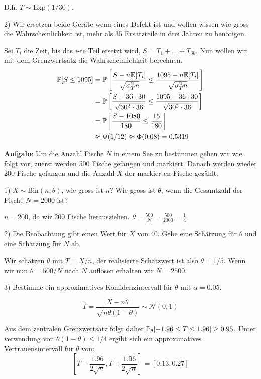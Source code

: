 D.h. $T \sim \text{Exp}(1/30)$.

\smallskip

2) Wir ersetzen beide Geräte wenn eines Defekt ist und wollen wissen wie gross die Wahrscheinlichkeit ist, mehr als 35 Ersatzteile in drei Jahren zu benötigen.

Sei $T_i$ die Zeit, bis das $i$-te Teil ersetzt wird, $S = T_1 + ... + T_{36}$. Nun wollen wir mit dem Grenzwertsatz die Wahrscheinlichkeit berechnen.
\begin{align*}
	\mathbb{P}[S \leq 1095] &= \mathbb{P} \left[ \frac{S - n \mathbb{E}[T_i]}{\sqrt{\sigma_T^2 n}} \leq \frac{1095 - n \mathbb{E}[T_i]}{\sqrt{\sigma_T^2 n}}\right] \\
	&= \mathbb{P} \left[ \frac{S - 36 \cdot 30}{\sqrt{30^2 \cdot 36}} \leq \frac{1095 - 36 \cdot 30}{\sqrt{30^2 \cdot 36}} \right] \\
	&= \mathbb{P} \left[ \frac{S - 1080}{180} \leq \frac{15}{180} \right] \\
	&\approx \Phi(1/12) \approx \Phi(0.08) = 0.5319
\end{align*}

\hrulefill

\textbf{Aufgabe}
Um die Anzahl Fische $N$ in einem See zu bestimmen gehen wir wie folgt vor, zuerst werden 500 Fische gefangen und markiert. Danach werden wieder 200 Fische gefangen und die Anzahl $X$ der markierten Fische gezählt. \smallskip

1) $X \sim \text{Bin}(n, \theta)$, wie gross ist $n$? Wie gross ist $\theta$, wenn die Gesamtzahl der Fische $N = 2000$ ist?

$n = 200$, da wir 200 Fische herausziehen. $\theta = \frac{500}{N} = \frac{500}{2000} = \frac{1}{4}$ \smallskip

2) Die Beobachtung gibt einen Wert für $X$ von 40. Gebe eine Schätzung für $\theta$ und eine Schätzung für $N$ ab.

Wir schätzen $\theta$ mit $T = X / n$, der realisierte Schätzwert ist also $\theta = 1/5$. Wenn wir nun $\theta = 500 / N$ nach $N$ auflösen erhalten wir $N = 2500$. \smallskip

3) Bestimme ein approximatives Konfidenzintervall für $\theta$ mit $\alpha = 0.05$.

$$T = \frac{X - n \theta}{\sqrt{n\theta(1-\theta)}} \sim \mathcal N (0,1)$$

Aus dem zentralen Grenzwertsatz folgt daher $\mathbb{P}_\theta [-1.96 \leq T \leq 1.96] \geq 0.95$. Unter verwendung von $\theta(1- \theta) \leq 1/4$ ergibt sich ein approximatives Vertrauensintervall für $\theta$ von:
$$[T - \frac{1.96}{2\sqrt{n}}, T + \frac{1.96}{2 \sqrt{n}}] = [0.13, 0.27]$$


